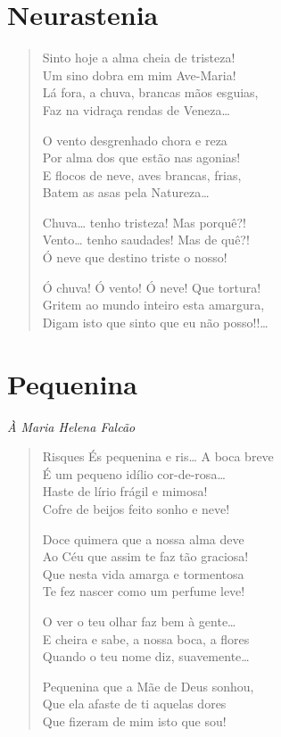 \chapter{Neurastenia}

\begin{verse}
Sinto hoje a alma cheia de tristeza!\\
Um sino dobra em mim Ave-Maria!\\
Lá fora, a chuva, brancas mãos esguias,\\
Faz na vidraça rendas de Veneza\ldots{}

O vento desgrenhado chora e reza\\
Por alma dos que estão nas agonias!\\
E flocos de neve, aves brancas, frias,\\
Batem as asas pela Natureza\ldots{}

Chuva\ldots{} tenho tristeza! Mas porquê?!\\
Vento\ldots{} tenho saudades! Mas de quê?!\\
Ó neve que destino triste o nosso!

Ó chuva! Ó vento! Ó neve! Que tortura!\\
Gritem ao mundo inteiro esta amargura,\\
Digam isto que sinto que eu não posso!!\ldots{} 
\end{verse}

\chapter{Pequenina}

\hfill{}\textit{À Maria Helena Falcão}

\begin{verse}
Risques És pequenina e ris\ldots{} A boca breve\\
É um pequeno idílio cor-de-rosa\ldots{}\\
Haste de lírio frágil e mimosa!\\
Cofre de beijos feito sonho e neve!

Doce quimera que a nossa alma deve\\
Ao Céu que assim te faz tão graciosa!\\
Que nesta vida amarga e tormentosa\\
Te fez nascer como um perfume leve!

O ver o teu olhar faz bem à gente\ldots{}\\
E cheira e sabe, a nossa boca, a flores\\
Quando o teu nome diz, suavemente\ldots{}

Pequenina que a Mãe de Deus sonhou,\\
Que ela afaste de ti aquelas dores\\
Que fizeram de mim isto que sou!
\end{verse}

